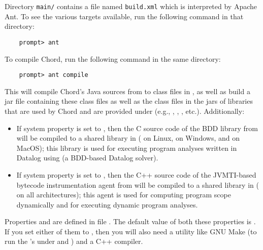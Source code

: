 Directory {\tt main/} contains a file named {\tt build.xml} which is
interpreted by Apache Ant.  To see the various targets available, run
the following command in that directory:

\begin{verbatim}
    prompt> ant
\end{verbatim}

To compile Chord, run the following command in the same directory:

\begin{verbatim}
    prompt> ant compile
\end{verbatim}

This will compile Chord's Java sources from  to class files
in , as well as build a jar file  containing
these class files as well as the class files in the jars of libraries that are used by Chord
and are provided under  (e.g., , ,
, etc.).
Additionally:

\begin{itemize}
\item

If system property  is set to ,
then the C source code of the  BDD library
from  will be compiled to a shared library in 
( on Linux,  on Windows, and
 on MacOS); this library is used for executing
program analyses written in Datalog
using  (a BDD-based Datalog solver).

\item

If system property  is set to ,
then the C++ source code of the JVMTI-based bytecode instrumentation agent from
 will be compiled to a shared library in 
( on all architectures); this agent is
used for computing program scope dynamically and for executing
dynamic program analyses.
\end{itemize}

Properties  and  are defined in file .  The
default value of both these properties is .
If you set either of them to , then you will also need a utility like GNU Make (to run the
's under  and ) and a C++ compiler.

